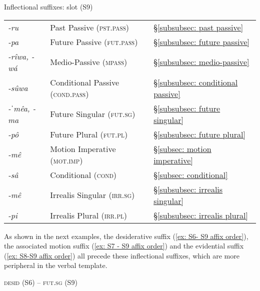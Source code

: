 \ea\label{ex: S9 suffixes}
{Inflectional suffixes: slot (S9) }

\begin{tabular}{lll}
\textit{-ru} & Past Passive (\textsc{pst.pass}) & §\ref{subsubsec: past passive}\\
\textit{-pa} & Future Passive (\textsc{fut.pass}) & §\ref{subsubsec: future passive}\\
\textit{-rîwa, -wá} & Medio-Passive (\textsc{mpass}) & §\ref{subsubsec: medio-passive}\\
\textit{-sûwa} & Conditional Passive (\textsc{cond.pass}) & §\ref{subsubsec: conditional passive}\\
\textit{-ˈmêa, -ma} & Future Singular  (\textsc{fut.sg}) & §\ref{subsubsec: future singular}\\
\textit{-pô} & Future Plural (\textsc{fut.pl}) & §\ref{subsubsec: future plural}\\
\textit{-mê} & Motion Imperative (\textsc{mot.imp}) & §\ref{subsec: motion imperative}\\
\textit{-sâ} & Conditional (\textsc{cond}) & §\ref{subsec: conditional}\\
\textit{-mê} & Irrealis Singular (\textsc{irr.sg}) & §\ref{subsubsec: irrealis singular}\\
\textit{-pi} & Irrealis Plural (\textsc{irr.pl}) & §\ref{subsubsec: irrealis plural}\\

\end{tabular}

\z

\largerpage
As shown in the next examples, the desiderative suffix (\ref{ex: S6- S9 affix order}), the associated motion suffix (\ref{ex: S7 - S9 affix order}) and the evidential suffix (\ref{ex: S8-S9 affix order}) all precede these inflectional suffixes, which are more peripheral in the verbal template.


\ea\label{ex: S6- S9 affix order}
{\textsc{desid} (S6) -- \textsc{fut.sg} (S9)}


